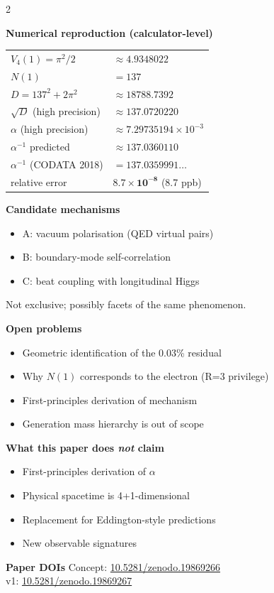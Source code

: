\documentclass[9pt,a4paper]{article}
\begin{document}
\begin{multicols}{2}
\columnbreak

\textbf{Numerical reproduction (calculator-level)}

\vspace{1pt}
{\footnotesize
\begin{tabular}{@{}ll@{}}
\toprule
$V_4(1) = \pi^2/2$ & $\approx 4.9348022$ \\
$N(1)$ & $= 137$ \\
$D = 137^2 + 2\pi^2$ & $\approx 18788.7392$ \\
$\sqrt{D}$ (high precision) & $\approx 137.0720220$ \\
$\alpha$ (high precision) & $\approx 7.29735194 \times 10^{-3}$ \\
$\alpha^{-1}$ predicted & $\approx 137.0360110$ \\
$\alpha^{-1}$ (CODATA 2018) & $= 137.0359991\ldots$ \\
relative error & $\mathbf{8.7 \times 10^{-8}}$ (8.7 ppb) \\
\bottomrule
\end{tabular}
}

\smallskip
\textbf{Candidate mechanisms}
\begin{itemize}[topsep=1pt]
\item A: vacuum polarisation (QED virtual pairs)
\item B: boundary-mode self-correlation
\item C: beat coupling with longitudinal Higgs
\end{itemize}
Not exclusive; possibly facets of the same phenomenon.

\smallskip
\textbf{Open problems}
\begin{itemize}[topsep=1pt]
\item Geometric identification of the 0.03\% residual
\item Why $N(1)$ corresponds to the electron (R=3 privilege)
\item First-principles derivation of mechanism
\item Generation mass hierarchy is out of scope
\end{itemize}

\smallskip
\textbf{What this paper does \emph{not} claim}
\begin{itemize}[topsep=1pt]
\item First-principles derivation of $\alpha$
\item Physical spacetime is 4+1-dimensional
\item Replacement for Eddington-style predictions
\item New observable signatures
\end{itemize}

\smallskip
\textbf{Paper DOIs}\enspace
{\scriptsize Concept: \href{https://doi.org/10.5281/zenodo.19869266}{10.5281/zenodo.19869266}\\
v1: \href{https://doi.org/10.5281/zenodo.19869267}{10.5281/zenodo.19869267}}

\end{multicols}
\end{document}
